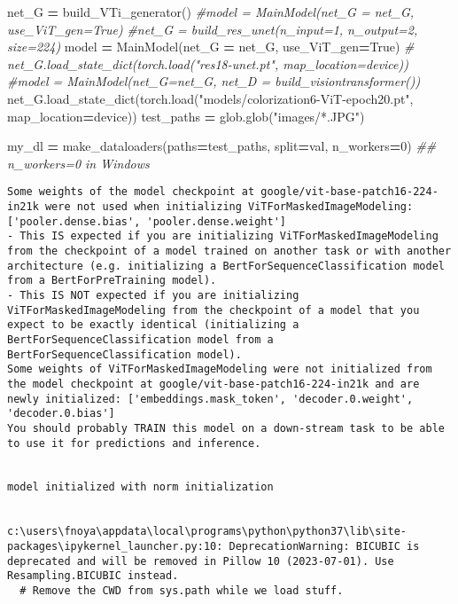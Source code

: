 \documentclass[
]{article}
\newenvironment{Shaded}{\begin{snugshade}}{\end{snugshade}}
\newcommand{\CommentTok}[1]{\textcolor[rgb]{0.56,0.35,0.01}{\textit{#1}}}
\newcommand{\DecValTok}[1]{\textcolor[rgb]{0.00,0.00,0.81}{#1}}
\newcommand{\NormalTok}[1]{#1}
\newcommand{\OperatorTok}[1]{\textcolor[rgb]{0.81,0.36,0.00}{\textbf{#1}}}
\newcommand{\StringTok}[1]{\textcolor[rgb]{0.31,0.60,0.02}{#1}}
\newcommand{\VariableTok}[1]{\textcolor[rgb]{0.00,0.00,0.00}{#1}}
\begin{document}
\begin{Shaded}
\begin{Highlighting}[]
\NormalTok{net\_G }\OperatorTok{=}\NormalTok{ build\_VTi\_generator()}
\CommentTok{\#model = MainModel(net\_G = net\_G, use\_ViT\_gen=True)}
\CommentTok{\#net\_G = build\_res\_unet(n\_input=1, n\_output=2, size=224)}
\NormalTok{model }\OperatorTok{=}\NormalTok{ MainModel(net\_G }\OperatorTok{=}\NormalTok{ net\_G, use\_ViT\_gen}\OperatorTok{=}\VariableTok{True}\NormalTok{)}
\CommentTok{\# net\_G.load\_state\_dict(torch.load("res18{-}unet.pt", map\_location=device))}
\CommentTok{\#model = MainModel(net\_G=net\_G, net\_D = build\_visiontransformer())}
\NormalTok{net\_G.load\_state\_dict(torch.load(}\StringTok{"models/colorization6{-}ViT{-}epoch20.pt"}\NormalTok{, map\_location}\OperatorTok{=}\NormalTok{device))}
\NormalTok{test\_paths }\OperatorTok{=}\NormalTok{ glob.glob(}\StringTok{"images/*.JPG"}\NormalTok{)}

\NormalTok{my\_dl }\OperatorTok{=}\NormalTok{ make\_dataloaders(paths}\OperatorTok{=}\NormalTok{test\_paths, split}\OperatorTok{=}\StringTok{\textquotesingle{}val\textquotesingle{}}\NormalTok{,  n\_workers}\OperatorTok{=}\DecValTok{0}\NormalTok{)  }\CommentTok{\#\# n\_workers=0 in Windows}
\end{Highlighting}
\end{Shaded}

\begin{verbatim}
Some weights of the model checkpoint at google/vit-base-patch16-224-in21k were not used when initializing ViTForMaskedImageModeling: ['pooler.dense.bias', 'pooler.dense.weight']
- This IS expected if you are initializing ViTForMaskedImageModeling from the checkpoint of a model trained on another task or with another architecture (e.g. initializing a BertForSequenceClassification model from a BertForPreTraining model).
- This IS NOT expected if you are initializing ViTForMaskedImageModeling from the checkpoint of a model that you expect to be exactly identical (initializing a BertForSequenceClassification model from a BertForSequenceClassification model).
Some weights of ViTForMaskedImageModeling were not initialized from the model checkpoint at google/vit-base-patch16-224-in21k and are newly initialized: ['embeddings.mask_token', 'decoder.0.weight', 'decoder.0.bias']
You should probably TRAIN this model on a down-stream task to be able to use it for predictions and inference.


model initialized with norm initialization


c:\users\fnoya\appdata\local\programs\python\python37\lib\site-packages\ipykernel_launcher.py:10: DeprecationWarning: BICUBIC is deprecated and will be removed in Pillow 10 (2023-07-01). Use Resampling.BICUBIC instead.
  # Remove the CWD from sys.path while we load stuff.
\end{verbatim}
\end{document}
